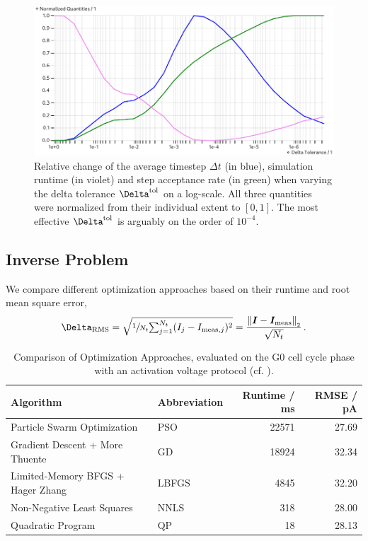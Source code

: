\begin{figure}
  \includegraphics[width=\columnwidth]{../figures/results/delta-tolerance.pdf}
  \caption{Relative change of the average timestep $\Delta t$ (in blue), simulation runtime (in violet) and step acceptance rate (in green) when varying the delta tolerance $\Delta^{\rm tol}$ on a log-scale. All three quantities were normalized from their individual extent to $[0, 1]$. The most effective $\Delta^{\rm tol}$ is arguably on the order of $10^{-4}$.}
  \label{figure:delta-tolerance}
\end{figure}

\subsection{Inverse Problem}
We compare different optimization approaches based on their runtime and root mean square error,
$$\Delta_{\rm RMS} = \sqrt{\sfrac{1}{N_t} {\textstyle \sum_{j=1}^{N_t}} (I_j - I_{{\rm meas}, j})^2} = \frac{\norm{\vec{I} - \vec{I}_{\rm meas}}}{\sqrt{N_t}}\,.$$

\begin{table}[ht]
  \centering
  \caption{Comparison of Optimization Approaches, evaluated on the G0 cell cycle phase with an activation voltage protocol (cf. ).}
  \begin{tabular}{llrr}
    \textbf{Algorithm}                          & \textbf{Abbreviation} & \textbf{Runtime} / ms & \textbf{RMSE} / pA \\
    \midrule
    Particle Swarm Optimization                 & PSO                   & 22571                 & 27.69              \\
    Gradient Descent + More Thuente             & GD                    & 18924                 & 32.34              \\
    Limited-Memory BFGS + Hager Zhang           & LBFGS                 & 4845                  & 32.20              \\
    Non-Negative Least Squares \cite{1997-nnls} & NNLS                  & 318                   & 28.00              \\
    Quadratic Program                           & QP                    & 18                    & 28.13              \\
  \end{tabular}
  \label{table:optimization-comparison}
\end{table}

